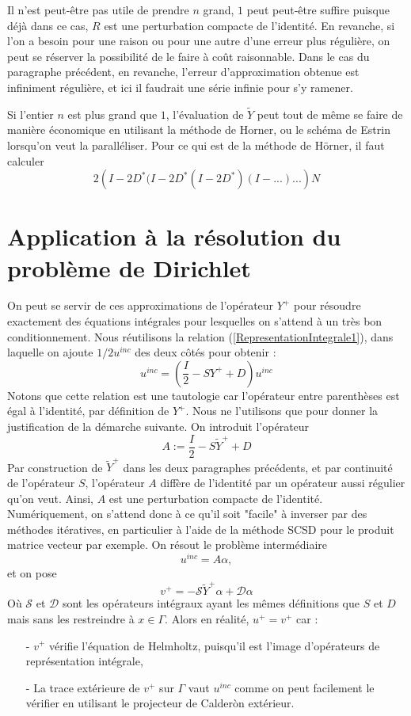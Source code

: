 \documentclass[11pt,a4paper]{article}
\begin{document}
\begin{Rem}Il n'est peut-être pas utile de prendre $n$ grand, $1$ peut peut-être suffire puisque déjà dans ce cas, $R$ est une perturbation compacte de l'identité. En revanche, si l'on a besoin pour une raison ou pour une autre d'une erreur plus régulière, on peut se réserver la possibilité de le faire à coût raisonnable. Dans le cas du paragraphe précédent, en revanche, l'erreur d'approximation obtenue est infiniment régulière, et ici il faudrait une série infinie pour s'y ramener. 
\end{Rem}
\begin{Rem}Si l'entier $n$ est plus grand que $1$, l'évaluation de $\tilde{Y}$ peut tout de même se faire de manière économique en utilisant la méthode de Horner, ou le schéma de Estrin lorsqu'on veut la paralléliser. Pour ce qui est de la méthode de Hörner, il faut calculer 
\[2\left(I-2D^*(I-2D^*(I-2D^*)(I-... )...\right)N\]
\end{Rem}

\section{Application à la résolution du problème de Dirichlet}

On peut se servir de ces approximations de l'opérateur $Y^+$ pour résoudre exactement des équations intégrales pour lesquelles on s'attend à un très bon conditionnement. Nous réutilisons la relation (\ref{RepresentationIntegrale1}), dans laquelle on ajoute $1/2u^{inc}$ des deux côtés pour obtenir : 
\[u^{inc} = \left(\dfrac{I}{2} - SY^+ + D\right)u^{inc}\]
Notons que cette relation est une tautologie car l'opérateur entre parenthèses est égal à l'identité, par définition de $Y^+$. Nous ne l'utilisons que pour donner la justification de la démarche suivante. On introduit l'opérateur 
\[ A := \dfrac{I}{2} - S\tilde{Y}^+ + D\]
Par construction de $\tilde{Y}^+$ dans les deux paragraphes précédents, et par continuité de l'opérateur $S$, l'opérateur $A$ diffère de l'identité par un opérateur aussi régulier qu'on veut. Ainsi, $A$ est une perturbation compacte de l'identité. Numériquement, on s'attend donc à ce qu'il soit "facile" à inverser par des méthodes itératives, en particulier à l'aide de la méthode SCSD pour le produit matrice vecteur par exemple. On résout le problème intermédiaire 
\[u^{inc} = A\alpha,\]
et on pose 
\[v^+ = -\mathcal{S}\tilde{Y}^+\alpha + \mathcal{D}\alpha\]
Où $\mathcal{S}$ et $\mathcal{D}$ sont les opérateurs intégraux ayant les mêmes définitions que $S$ et $D$ mais sans les restreindre à $x\in \Gamma$.
Alors en réalité, $u^+ = v^+$ car :
\begin{itemize}
\item[-] $v^{+}$ vérifie l'équation de Helmholtz, puisqu'il est l'image d'opérateurs de représentation intégrale,
\item[-] La trace extérieure de $v^+$ sur $\Gamma$ vaut $u^{inc}$ comme on peut facilement le vérifier en utilisant le projecteur de Calderòn extérieur.   
\end{itemize}
\end{document}
